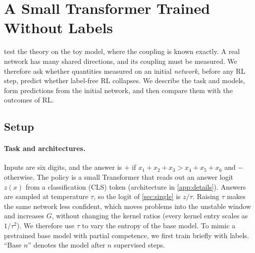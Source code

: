 \section{A Small Transformer Trained Without Labels}
\label{sec:nn}

 test the theory on the toy model, where the coupling is known exactly. A real network has many shared directions, and its coupling must be measured.
We therefore ask whether quantities measured on an initial \emph{network}, before any RL step, predict whether label-free RL collapses.
We describe the task and models, form predictions from the initial network, and then compare them with the outcomes of RL.

\subsection{Setup}
\label{sec:nnsetup}

\paragraph{Task and architectures.}
Inputs are six digits, and the answer is $+$ if $x_1+x_2+x_3>x_4+x_5+x_6$ and $-$ otherwise.
The policy is a small Transformer that reads out an answer logit $z(x)$ from a classification (CLS) token (architecture in \cref{app:details}). Answers are sampled at temperature $\tau$, so the logit of \cref{sec:single} is $z/\tau$.
Raising $\tau$ makes the same network less confident, which moves problems into the unstable window and increases $G$, without changing the kernel ratios (every kernel entry scales as $1/\tau^2$). We therefore use $\tau$ to vary the entropy of the base model.
To mimic a pretrained base model with partial competence, we first train briefly with labels. ``Base $n$'' denotes the model after $n$ supervised steps.

